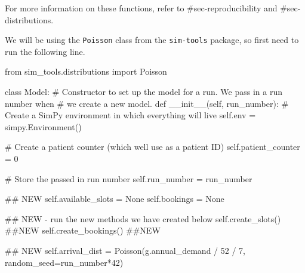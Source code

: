 \documentclass[
  letterpaper,
  DIV=11,
  numbers=noendperiod]{scrreprt}
\newenvironment{Shaded}{}{}
\newcommand{\CommentTok}[1]{\textcolor[rgb]{0.42,0.45,0.49}{#1}}
\newcommand{\DecValTok}[1]{\textcolor[rgb]{0.00,0.36,0.77}{#1}}
\newcommand{\FunctionTok}[1]{\textcolor[rgb]{0.44,0.26,0.76}{#1}}
\newcommand{\ImportTok}[1]{\textcolor[rgb]{0.01,0.18,0.38}{#1}}
\newcommand{\KeywordTok}[1]{\textcolor[rgb]{0.84,0.23,0.29}{#1}}
\newcommand{\NormalTok}[1]{\textcolor[rgb]{0.14,0.16,0.18}{#1}}
\newcommand{\OperatorTok}[1]{\textcolor[rgb]{0.14,0.16,0.18}{#1}}
\newcommand{\VariableTok}[1]{\textcolor[rgb]{0.89,0.38,0.04}{#1}}
\newcommand*\circled[1]{\tikz[baseline=(char.base)]{
          \node[shape=circle,draw,inner sep=1pt] (char) {{\scriptsize#1}};}}
\begin{document}
For more information on these functions, refer to \#sec-reproducibility
and \#sec-distributions.

We will be using the \texttt{Poisson} class from the \texttt{sim-tools}
package, so first need to run the following line.

\begin{Shaded}
\begin{Highlighting}[]
\ImportTok{from}\NormalTok{ sim\_tools.distributions }\ImportTok{import}\NormalTok{ Poisson}
\end{Highlighting}
\end{Shaded}

\label{annotated-cell-189}%
\begin{Shaded}
\begin{Highlighting}[]
\KeywordTok{class}\NormalTok{ Model:}
    \CommentTok{\# Constructor to set up the model for a run.  We pass in a run number when}
    \CommentTok{\# we create a new model.}
    \KeywordTok{def} \FunctionTok{\_\_init\_\_}\NormalTok{(}\VariableTok{self}\NormalTok{, run\_number):}
        \CommentTok{\# Create a SimPy environment in which everything will live}
        \VariableTok{self}\NormalTok{.env }\OperatorTok{=}\NormalTok{ simpy.Environment()}

        \CommentTok{\# Create a patient counter (which we\textquotesingle{}ll use as a patient ID)}
        \VariableTok{self}\NormalTok{.patient\_counter }\OperatorTok{=} \DecValTok{0}

        \CommentTok{\# Store the passed in run number}
        \VariableTok{self}\NormalTok{.run\_number }\OperatorTok{=}\NormalTok{ run\_number}

        \CommentTok{\#\# NEW}
        \VariableTok{self}\NormalTok{.available\_slots }\OperatorTok{=} \VariableTok{None}
        \VariableTok{self}\NormalTok{.bookings }\OperatorTok{=} \VariableTok{None}

        \CommentTok{\#\# NEW {-} run the new methods we have created below}
        \VariableTok{self}\NormalTok{.create\_slots() }\CommentTok{\#\#NEW}
        \VariableTok{self}\NormalTok{.create\_bookings() }\CommentTok{\#\#NEW}

        \CommentTok{\#\# NEW}
        \VariableTok{self}\NormalTok{.arrival\_dist }\OperatorTok{=}\NormalTok{ Poisson(g.annual\_demand }\OperatorTok{/} \DecValTok{52} \OperatorTok{/} \DecValTok{7}\NormalTok{, }\hspace*{\fill}\NormalTok{\circled{1}}
\NormalTok{                                    random\_seed}\OperatorTok{=}\NormalTok{run\_number}\OperatorTok{*}\DecValTok{42}\NormalTok{) }\hspace*{\fill}\NormalTok{\circled{2}}


\end{Highlighting}
\end{Shaded}
\end{document}
